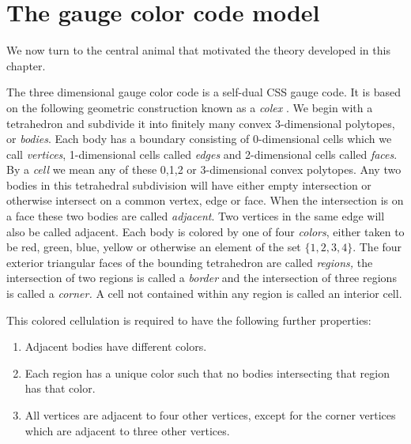 \section{The gauge color code model}

%

We now turn to the central animal that motivated
the theory developed in this chapter.

The three dimensional gauge color code \cite{Bombin2015,Bombin2015single,Kubica2015}
is a self-dual CSS gauge code. 
It is based on the following geometric construction known
as a \emph{colex} \cite{Bombin2007exact}.
We begin with a tetrahedron and subdivide it into finitely many
convex 3-dimensional polytopes, or \emph{bodies}.
Each body has a boundary consisting of 0-dimensional cells
which we call \emph{vertices}, 1-dimensional cells called \emph{edges}
and 2-dimensional cells called \emph{faces}.
By a \emph{cell} we mean any of these 0,1,2 or 3-dimensional convex polytopes.
Any two bodies in this tetrahedral subdivision will
have either empty intersection or otherwise intersect
on a common vertex, edge or face.
When the intersection is on a face these two bodies
are called \emph{adjacent}.
Two vertices in the same edge will also be called adjacent.
Each body is colored by one of four \emph{colors},
either taken to be red, green, blue, yellow or 
otherwise an element of the set $\{1, 2, 3, 4\}.$
The four exterior triangular faces of the bounding tetrahedron are
called \emph{regions,} the intersection of two regions is called
a \emph{border} and the intersection of three regions is called
a \emph{corner.}
A cell not contained within any region is called an interior cell.

This colored cellulation is required to have the following further properties:
\begin{enumerate}
\item Adjacent bodies have different colors.
\item Each region has a unique color 
such that no bodies intersecting that region has that color.
\item All vertices are adjacent to four other vertices,
except for the corner vertices which are adjacent to three other vertices.
\end{enumerate}

